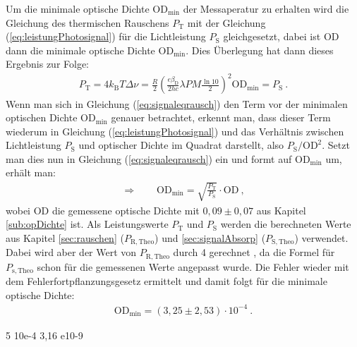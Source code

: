 Um die minimale optische Dichte $\mathrm{OD}_\mathrm{min}$ der Messaperatur zu erhalten wird die Gleichung des thermischen Rauschens $P_\mathrm{T}$ mit der Gleichung (\ref{eq:leistungPhotosignal}) für die Lichtleistung $P_\mathrm{S}$ gleichgesetzt, dabei ist OD dann die minimale optische Dichte $\mathrm{OD}_\mathrm{min}$. Dies Überlegung hat dann dieses Ergebnis zur Folge:
\begin{gather}
    P_\mathrm{T} = 4 k_\mathrm{B} T \Delta \nu = \frac{R}{2}\left(\frac{e\beta_\mathrm{D}}{2hc}\lambda P M \frac{\ln10}{2}\right)^2 \mathrm{OD}_\mathrm{min}  = P_\mathrm{S}~.
    \label{eq:signaleqrausch}
\end{gather}
Wenn man sich in Gleichung (\ref{eq:signaleqrausch}) den Term vor der minimalen optischen Dichte $\mathrm{OD}_\mathrm{min}$ genauer betrachtet, erkennt man, dass dieser Term wiederum in Gleichung (\ref{eq:leistungPhotosignal}) und das Verhältnis zwischen Lichtleistung $P_\mathrm{S}$ und optischer Dichte im Quadrat darstellt, also $P_\mathrm{S}/\mathrm{OD}^2$. Setzt man dies nun in Gleichung (\ref{eq:signaleqrausch}) ein und formt auf $\mathrm{OD}_\mathrm{min}$ um, erhält man:
\begin{gather}
    \Rightarrow \qquad \boxed{\mathrm{OD}_\mathrm{min} = \sqrt{\frac{P_\mathrm{T}}{P_\mathrm{S}}} \cdot \mathrm{OD}}~,
    \label{eq:minopDichte}
\end{gather}
wobei $\mathrm{OD}$ die gemessene optische Dichte mit $0,09 \pm 0,07$ aus Kapitel \ref{sub:opDichte} ist. Als Leistungswerte $P_\mathrm{T}$ und $P_\mathrm{S}$ werden die berechneten Werte aus Kapitel \ref{sec:rauschen} ($P_\mathrm{R,Theo}$) und \ref{sec:signalAbsorp} ($P_\mathrm{S,Theo}$)  verwendet. Dabei wird aber der Wert von $P_\mathrm{R,Theo}$ durch 4 gerechnet \cite{anleitung}, da die Formel für $P_\mathrm{s,Theo}$ schon für die gemessenen Werte angepasst wurde. Die Fehler wieder mit dem Fehlerfortpflanzungsgesetz ermittelt und damit folgt für die minimale optische Dichte:
\begin{gather}
    \boxed{\mathrm{OD}_\mathrm{min} = (3,25 \pm 2,53) \cdot 10^{-4}}~.
\end{gather}

5 10e-4 3,16 e10-9

